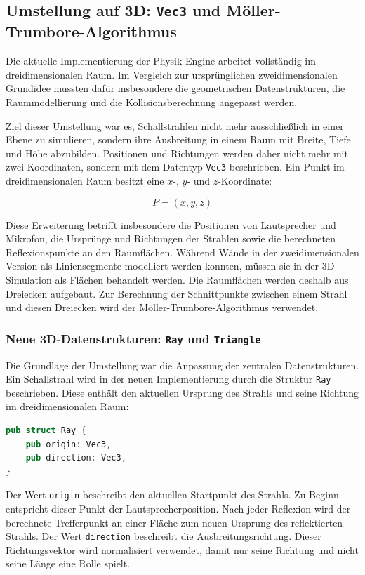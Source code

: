 \subsection{Umstellung auf 3D: \texttt{Vec3} und Möller-Trumbore-Algorithmus}
\label{subsec:3d_migration}

Die aktuelle Implementierung der Physik-Engine arbeitet vollständig im
dreidimensionalen Raum. Im Vergleich zur ursprünglichen zweidimensionalen
Grundidee mussten dafür insbesondere die geometrischen Datenstrukturen, die
Raummodellierung und die Kollisionsberechnung angepasst werden.

Ziel dieser Umstellung war es, Schallstrahlen nicht mehr ausschließlich in
einer Ebene zu simulieren, sondern ihre Ausbreitung in einem Raum mit Breite,
Tiefe und Höhe abzubilden. Positionen und Richtungen werden daher nicht mehr
mit zwei Koordinaten, sondern mit dem Datentyp \texttt{Vec3} beschrieben. Ein
Punkt im dreidimensionalen Raum besitzt eine \(x\)-, \(y\)- und
\(z\)-Koordinate:

\[
    P = (x,y,z)
\]

Diese Erweiterung betrifft insbesondere die Positionen von Lautsprecher und
Mikrofon, die Ursprünge und Richtungen der Strahlen sowie die berechneten
Reflexionspunkte an den Raumflächen. Während Wände in der zweidimensionalen
Version als Liniensegmente modelliert werden konnten, müssen sie in der
3D-Simulation als Flächen behandelt werden. Die Raumflächen werden deshalb aus
Dreiecken aufgebaut. Zur Berechnung der Schnittpunkte zwischen einem Strahl
und diesen Dreiecken wird der Möller-Trumbore-Algorithmus verwendet.

\subsubsection{Neue 3D-Datenstrukturen: \texttt{Ray} und \texttt{Triangle}}
\label{subsubsec:ray_triangle}

Die Grundlage der Umstellung war die Anpassung der zentralen Datenstrukturen.
Ein Schallstrahl wird in der neuen Implementierung durch die Struktur
\texttt{Ray} beschrieben. Diese enthält den aktuellen Ursprung des Strahls und
seine Richtung im dreidimensionalen Raum:

\begin{lstlisting}[language=Rust]
pub struct Ray {
    pub origin: Vec3,
    pub direction: Vec3,
}
\end{lstlisting}

Der Wert \texttt{origin} beschreibt den aktuellen Startpunkt des Strahls. Zu
Beginn entspricht dieser Punkt der Lautsprecherposition. Nach jeder Reflexion
wird der berechnete Trefferpunkt an einer Fläche zum neuen Ursprung des
reflektierten Strahls. Der Wert \texttt{direction} beschreibt die
Ausbreitungsrichtung. Dieser Richtungsvektor wird normalisiert verwendet, damit
nur seine Richtung und nicht seine Länge eine Rolle spielt.

